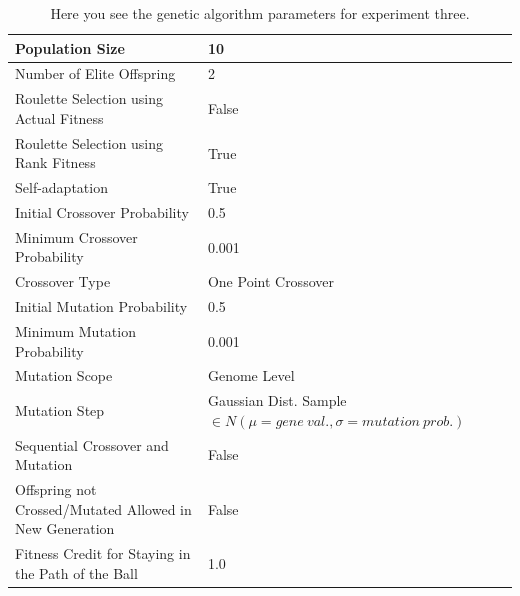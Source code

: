 \documentclass[a4paper,10pt]{article}
\begin{document}
\begin{table}[H]
\centering
\footnotesize
\begin{tabular}{ |>{\columncolor[gray]{0.8}} l | l| }
\hline
Population Size                                                      & 10                                                                           \\ \hline
Number of Elite Offspring                                            & 2                                                                            \\ \hline
Roulette Selection using Actual Fitness                              & False                                                                        \\ \hline
Roulette Selection using Rank Fitness                                & True                                                                         \\ \hline
Self-adaptation                                                      & True                                                                         \\ \hline
Initial Crossover Probability                                        & 0.5                                                                          \\ \hline
Minimum Crossover Probability                                        & 0.001                                                                        \\ \hline
Crossover Type                                                       & One Point Crossover                                                          \\ \hline
Initial Mutation Probability                                         & 0.5                                                                          \\ \hline
Minimum Mutation Probability                                         & 0.001                                                                        \\ \hline
Mutation Scope                                                       & Genome Level                                                                 \\ \hline
Mutation Step                                                        & Gaussian Dist. Sample $\in N(\mu=gene \ val., \sigma = mutation \ prob.)$    \\ \hline
Sequential Crossover and Mutation                                    & False                                                      	             \\ \hline
Offspring not Crossed/Mutated Allowed in New Generation              & False                                                     	                  \\ \hline
Fitness Credit for Staying in the Path of the Ball                   & 1.0                                                      	                  \\ \hline
\end{tabular}
\caption{Here you see the genetic algorithm parameters for experiment three.}
\label{tab:exp3}
\end{table}
\end{document}
